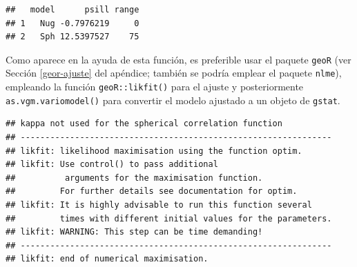 \documentclass[
]{book}
\newenvironment{Shaded}{\begin{snugshade}}{\end{snugshade}}
\newcommand{\AttributeTok}[1]{\textcolor[rgb]{0.13,0.29,0.53}{#1}}
\newcommand{\DecValTok}[1]{\textcolor[rgb]{0.00,0.00,0.81}{#1}}
\newcommand{\FloatTok}[1]{\textcolor[rgb]{0.00,0.00,0.81}{#1}}
\newcommand{\FunctionTok}[1]{\textcolor[rgb]{0.13,0.29,0.53}{\textbf{#1}}}
\newcommand{\NormalTok}[1]{#1}
\newcommand{\OtherTok}[1]{\textcolor[rgb]{0.56,0.35,0.01}{#1}}
\newcommand{\SpecialCharTok}[1]{\textcolor[rgb]{0.81,0.36,0.00}{\textbf{#1}}}
\newcommand{\StringTok}[1]{\textcolor[rgb]{0.31,0.60,0.02}{#1}}
\theoremstyle{break}
\theoremstyle{definition}
\theoremstyle{definition}
\theoremstyle{definition}
\theoremstyle{definition}
\theoremstyle{remark}
\begin{document}
\begin{verbatim}
##   model      psill range
## 1   Nug -0.7976219     0
## 2   Sph 12.5397527    75
\end{verbatim}

Como aparece en la ayuda de esta función, es preferible usar el paquete \texttt{geoR} (ver Sección \ref{geor-ajuste} del apéndice; también se podría emplear el paquete \texttt{nlme}), empleando la función \texttt{geoR::likfit()} para el ajuste y posteriormente \texttt{as.vgm.variomodel()} para convertir el modelo ajustado a un objeto de \texttt{gstat}.

\begin{Shaded}
\end{Shaded}

\begin{verbatim}
## kappa not used for the spherical correlation function
## ---------------------------------------------------------------
## likfit: likelihood maximisation using the function optim.
## likfit: Use control() to pass additional
##          arguments for the maximisation function.
##         For further details see documentation for optim.
## likfit: It is highly advisable to run this function several
##         times with different initial values for the parameters.
## likfit: WARNING: This step can be time demanding!
## ---------------------------------------------------------------
## likfit: end of numerical maximisation.
\end{verbatim}
\end{document}

